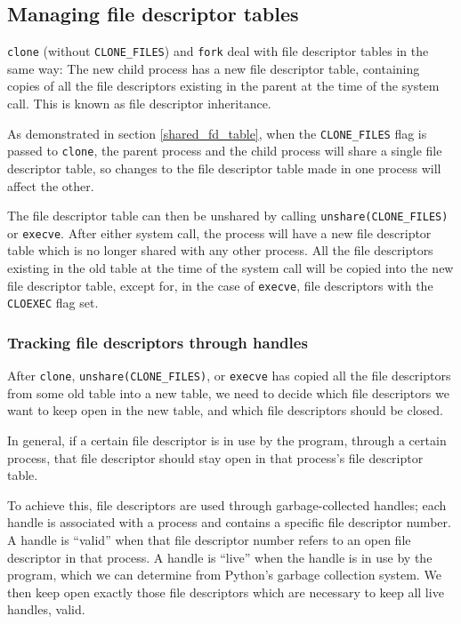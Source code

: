 \documentclass[letterpaper,twocolumn,10pt]{article}
\begin{document}
\subsection{Managing file descriptor tables}\label{fdtables}
\texttt{clone} (without \verb|CLONE_FILES|) and \texttt{fork}
deal with file descriptor tables in the same way:
The new child process has a new file descriptor table,
containing copies of all the file descriptors existing in the parent at the time of the system call.
This is known as file descriptor inheritance.

As demonstrated in section \ref{shared_fd_table},
when the \verb|CLONE_FILES| flag is passed to \texttt{clone},
the parent process and the child process will share a single file descriptor table,
so changes to the file descriptor table made in one process will affect the other.

The file descriptor table can then be unshared by calling \verb|unshare(CLONE_FILES)| or \texttt{execve}.
After either system call, the process will have a new file descriptor table
which is no longer shared with any other process.
All the file descriptors existing in the old table at the time of the system call
will be copied into the new file descriptor table,
except for, in the case of \texttt{execve}, file descriptors with the \texttt{CLOEXEC} flag set.
\subsubsection{Tracking file descriptors through handles}\label{handles}
After \texttt{clone}, \verb|unshare(CLONE_FILES)|, or \texttt{execve}
has copied all the file descriptors from some old table into a new table,
we need to decide which file descriptors we want to keep open in the new table,
and which file descriptors should be closed.

In general, if a certain file descriptor is in use by the program,
through a certain process,
that file descriptor should stay open in that process's file descriptor table.

To achieve this, file descriptors are used through garbage-collected handles;
each handle is associated with a process and contains a specific file descriptor number.
A handle is ``valid''
when that file descriptor number refers to an open file descriptor in that process.
A handle is ``live''
when the handle is in use by the program, which we can determine
from Python's garbage collection system.
We then keep open exactly those file descriptors which are necessary to keep all live handles, valid.
\end{document}
